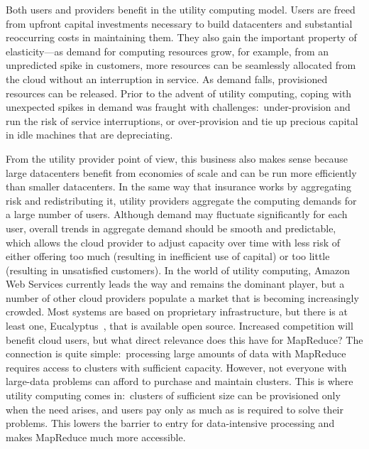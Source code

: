 Both users and providers benefit in the utility computing model.
Users are freed from upfront capital investments necessary to build
datacenters and substantial reoccurring costs in maintaining them.
They also gain the important property of elasticity---as demand for
computing resources grow, for example, from an unpredicted spike in
customers, more resources can be seamlessly allocated from the cloud
without an interruption in service.  As demand falls, provisioned
resources can be released.  Prior to the advent of utility computing,
coping with unexpected spikes in demand was fraught with
challenges:\ under-provision and run the risk of service
interruptions, or over-provision and tie up precious capital in idle
machines that are depreciating.

From the utility provider point of view, this business also makes
sense because large datacenters benefit from economies of scale and
can be run more efficiently than smaller datacenters.  In the same way
that insurance works by aggregating risk and redistributing it,
utility providers aggregate the computing demands for a large number
of users.  Although demand may fluctuate significantly for each user,
overall trends in aggregate demand should be smooth and predictable,
which allows the cloud provider to adjust capacity over time with less
risk of either offering too much (resulting in inefficient use of
capital) or too little (resulting in unsatisfied customers).  In the
world of utility computing, Amazon Web Services currently leads the
way and remains the dominant player, but a number of other cloud
providers populate a market that is becoming increasingly crowded.
Most systems are based on proprietary infrastructure, but there is at
least one, Eucalyptus~\cite{Nurmi_etal_2009}, that is available open
source.  
Increased competition will benefit cloud users, but what
direct relevance does this have for MapReduce?  The connection is
quite simple:\ processing large amounts of data with MapReduce
requires access to clusters with sufficient capacity.  However, not
everyone with large-data problems can afford to purchase and maintain
clusters.  This is where utility computing comes in:\ clusters of
sufficient size can be provisioned only when the need arises, and
users pay only as much as is required to solve their problems.  This
lowers the barrier to entry for data-intensive processing and makes
MapReduce much more accessible.

